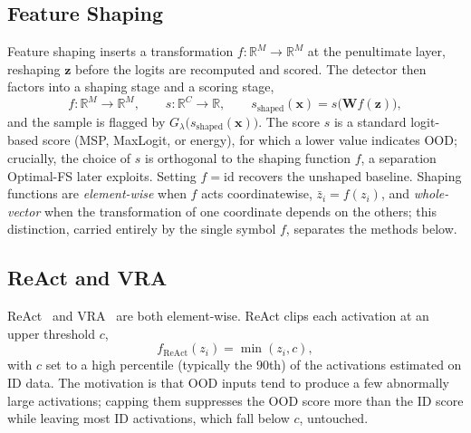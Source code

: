 \documentclass[a4paper]{article}
\begin{document}
\subsection{Feature Shaping}
\label{subsec:shaping}

Feature shaping inserts a transformation $f : \mathbb{R}^{M} \to \mathbb{R}^{M}$ at
the penultimate layer, reshaping $\mathbf{z}$ before the logits are recomputed and
scored. The detector then factors into a shaping stage and a scoring stage,
\begin{equation}
f : \mathbb{R}^{M} \to \mathbb{R}^{M}, \qquad
s : \mathbb{R}^{C} \to \mathbb{R}, \qquad
s_{\mathrm{shaped}}(\mathbf{x}) = s\big(\mathbf{W} f(\mathbf{z})\big),
\end{equation}
and the sample is flagged by $G_\lambda\big(s_{\mathrm{shaped}}(\mathbf{x})\big)$.
The score $s$ is a standard logit-based score (MSP, MaxLogit, or energy), for which
a lower value indicates OOD; crucially, the choice of $s$ is orthogonal to the
shaping function $f$, a separation Optimal-FS later exploits. Setting
$f = \mathrm{id}$ recovers the unshaped baseline. Shaping functions are
\emph{element-wise} when $f$ acts coordinatewise, $\bar{z}_i = f(z_i)$, and
\emph{whole-vector} when the transformation of one coordinate depends on the others;
this distinction, carried entirely by the single symbol $f$, separates the methods
below.

\subsection{ReAct and VRA}
\label{subsec:react-vra}

ReAct~\citep{react} and VRA~\citep{vra} are both element-wise. ReAct clips each
activation at an upper threshold $c$,
\begin{equation}
f_{\mathrm{ReAct}}(z_i) = \min(z_i, c),
\end{equation}
with $c$ set to a high percentile (typically the $90$th) of the activations
estimated on ID data. The motivation is that OOD inputs tend to produce a few
abnormally large activations; capping them suppresses the OOD score more than the ID
score while leaving most ID activations, which fall below $c$, untouched.
\end{document}
